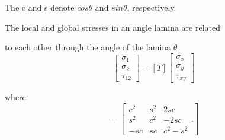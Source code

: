 The c and s denote $cos\theta $ and $sin\theta $, respectively.

The local and global stresses in an angle lamina are related

to each other through the angle of the lamina $\theta $
\begin{equation}\left[\begin{array}{l}\sigma _{1} \\ \sigma _{2} \\ \tau_{12}\end{array}\right]=[T]\left[\begin{array}{l}\sigma _{x} \\ \sigma _{y} \\\tau_{xy}\end{array}\right]
\end{equation}

where
\begin{equation}[T]=\left[\begin{array}{ccc}c^{2} & s^{2} & 2 s c \\ s^{2} & c^{2} & -2 s c \\ -s c & s c &c^{2}-s^{2}\end{array}\textstyle{.}\right] 
\end{equation}



